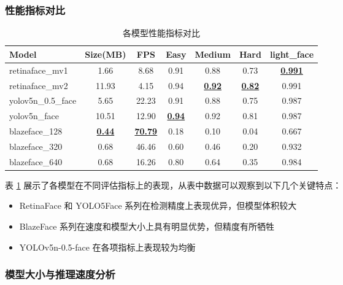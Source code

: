 \documentclass{article}
\begin{document}
\subsubsection{性能指标对比}

\begin{table}[!ht]
    \centering
    \begin{tabular}{l|c|c|c|c|c|c}
        \hline
        Model & Size(MB) & FPS & Easy & Medium & Hard & light\_face \\
        \hline
        retinaface\_mv1 & 1.66 & 8.68 & 0.91 & 0.88 & 0.73 & \underline{\textbf{0.991}} \\
        retinaface\_mv2 & 11.93 & 4.15 & 0.94 & \underline{\textbf{0.92}} & \underline{\textbf{0.82}} & 0.991 \\
        yolov5n\_0.5\_face & 5.65 & 22.23 & 0.91 & 0.88 & 0.75 & 0.987 \\
        yolov5n\_face & 10.51 & 12.90 & \underline{\textbf{0.94}} & 0.92 & 0.81 & 0.987 \\
        blazeface\_128 & \underline{\textbf{0.44}} & \underline{\textbf{70.79}} & 0.18 & 0.10 & 0.04 & 0.667 \\
        blazeface\_320 & 0.68 & 46.46 & 0.60 & 0.46 & 0.20 & 0.932 \\
        blazeface\_640 & 0.68 & 16.26 & 0.80 & 0.64 & 0.35 & 0.984 \\
        \hline
    \end{tabular}
    \caption{各模型性能指标对比}
    \label{tab:model_performance}
\end{table}

表 \ref{tab:model_performance} 展示了各模型在不同评估指标上的表现，从表中数据可以观察到以下几个关键特点：
\begin{itemize}
    \item RetinaFace 和 YOLO5Face 系列在检测精度上表现优异，但模型体积较大
    \item BlazeFace 系列在速度和模型大小上具有明显优势，但精度有所牺牲
    \item YOLOv5n-0.5-face 在各项指标上表现较为均衡
\end{itemize}

\subsubsection{模型大小与推理速度分析}
\end{document}
